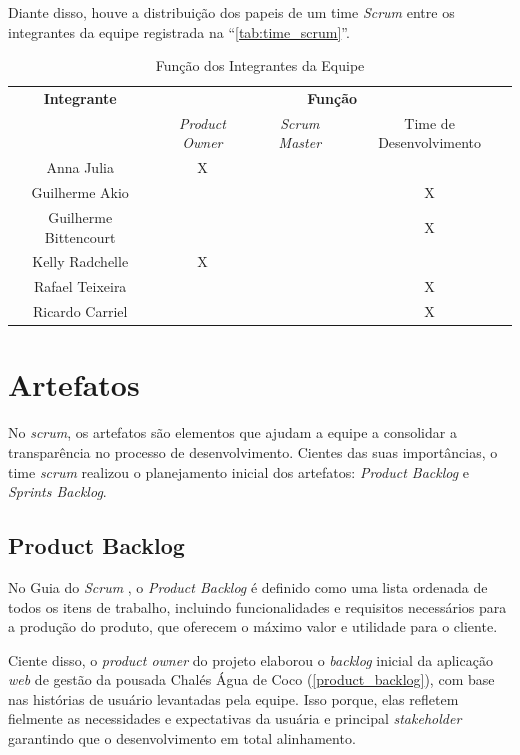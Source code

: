 \documentclass[
	12pt,				%
	openany,			%
	twoside,			%
	a4paper,			%
	english,			%
	french,				%
	spanish,			%
	brazil				%
	]{abntex2}
\begin{document}
Diante disso, houve a distribuição dos papeis de um time \textit{Scrum} entre os integrantes da equipe registrada na “\autoref{tab:time_scrum}”.

\begin{table}[htb]
	\centering
	\caption{Função dos Integrantes da Equipe}
	\label{tab:time_scrum}
	\begin{tabular}{|c|c|c|c|}
		\hline
		\textbf{Integrante} & \multicolumn{3}{c|}{\textbf{Função}} \\ \cline{2-4}
		& \textit{Product Owner} & \textit{Scrum Master} & Time de Desenvolvimento \\ \hline
		Anna Julia & X & & \\ \hline
		Guilherme Akio & & & X \\ \hline
		Guilherme Bittencourt & & & X \\ \hline
		Kelly Radchelle & X & & \\ \hline
		Rafael Teixeira & & & X \\ \hline
		Ricardo Carriel & & & X \\ \hline
	\end{tabular}
\end{table}

\section{Artefatos}
No \textit {scrum},  os artefatos são elementos que ajudam a equipe a consolidar a transparência no processo de desenvolvimento. Cientes das suas importâncias, o time \textit {scrum} realizou o planejamento inicial dos artefatos:  \textit {Product Backlog} e \textit {Sprints Backlog}.

\subsection{Product Backlog}
No Guia do \textit{Scrum} \cite{scrumguide}, o \textit{Product Backlog} é definido como uma lista ordenada de todos os itens de trabalho, incluindo funcionalidades e requisitos necessários para a produção do produto, que oferecem o máximo valor e utilidade para o cliente.

Ciente disso, o \textit{product owner} do projeto elaborou o \textit{backlog} inicial da aplicação \textit{web} de gestão da pousada Chalés Água de Coco (\autoref{product_backlog}), com base nas histórias de usuário levantadas pela equipe. Isso porque, elas refletem fielmente as necessidades e expectativas da usuária e principal \textit {stakeholder} garantindo que o desenvolvimento em total alinhamento.
\end{document}
